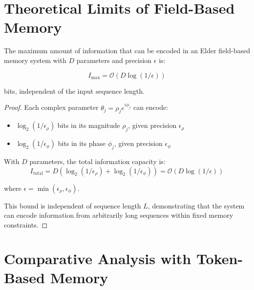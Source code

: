 \section{Theoretical Limits of Field-Based Memory}

\begin{theorem}
The maximum amount of information that can be encoded in an Elder field-based memory system with $D$ parameters and precision $\epsilon$ is:

\begin{equation}
I_{\max} = \mathcal{O}(D \log(1/\epsilon))
\end{equation}

bits, independent of the input sequence length.
\end{theorem}

\begin{proof}
Each complex parameter $\theta_j = \rho_j e^{i\phi_j}$ can encode:
\begin{itemize}
    \item $\log_2(1/\epsilon_\rho)$ bits in its magnitude $\rho_j$, given precision $\epsilon_\rho$
    \item $\log_2(1/\epsilon_\phi)$ bits in its phase $\phi_j$, given precision $\epsilon_\phi$
\end{itemize}

With $D$ parameters, the total information capacity is:
\begin{equation}
I_{\text{total}} = D(\log_2(1/\epsilon_\rho) + \log_2(1/\epsilon_\phi)) = \mathcal{O}(D \log(1/\epsilon))
\end{equation}

where $\epsilon = \min(\epsilon_\rho, \epsilon_\phi)$.

This bound is independent of sequence length $L$, demonstrating that the system can encode information from arbitrarily long sequences within fixed memory constraints.
\end{proof}

\section{Comparative Analysis with Token-Based Memory}

